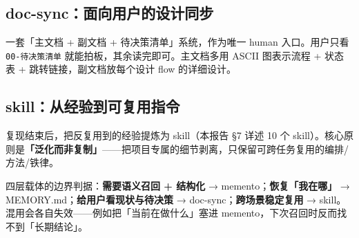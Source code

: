 \subsection{doc-sync：面向用户的设计同步}

一套「主文档 + 副文档 + 待决策清单」系统，作为唯一 human 入口。用户只看 \texttt{00-待决策清单} 就能拍板，其余读完即可。主文档多用 ASCII 图表示流程 + 状态表 + 跳转链接，副文档放每个设计 flow 的详细设计。

\subsection{skill：从经验到可复用指令}

复现结束后，把反复用到的经验提炼为 skill（本报告 §7 详述 10 个 skill）。核心原则是\textbf{「泛化而非复制」}——把项目专属的细节剥离，只保留可跨任务复用的编排/方法/铁律。

\begin{important}
四层载体的边界判据：\textbf{需要语义召回 + 结构化} → memento；\textbf{恢复「我在哪」} → MEMORY.md；\textbf{给用户看现状与待决策} → doc-sync；\textbf{跨场景稳定复用} → skill。混用会各自失效——例如把「当前在做什么」塞进 memento，下次召回时反而找不到「长期结论」。
\end{important}
